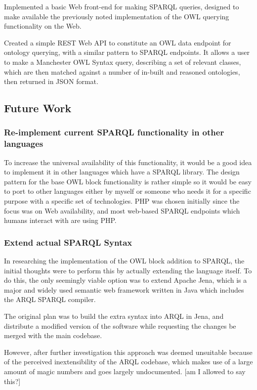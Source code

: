 \documentclass{article}
\begin{document}
Implemented a basic Web front-end for making SPARQL queries, designed to make
available the previously noted implementation of
the OWL querying functionality on the Web.

Created a simple REST Web API to constitute an OWL data endpoint for ontology
querying, with a similar pattern to SPARQL
endpoints. It allows a user to make a Manchester OWL Syntax query, describing a
set of relevant classes, which are then
matched against a number of in-built and reasoned ontologies, then returned in
JSON format.

\subsection{Future Work}

\subsubsection{Re-implement current SPARQL functionality in other languages}

To increase the universal availability of this functionality, it would be a good
idea to implement it in other languages which
have a SPARQL library. The design pattern for the base OWL block functionality
is rather simple so it would be easy to port
to other languages either by myself or someone who needs it for a specific
purpose with a specific set of technologies. PHP
was chosen initially since the focus was on Web availability, and most web-based
SPARQL endpoints which humans interact with
are using PHP.

\subsubsection{Extend actual SPARQL Syntax}

In researching the implementation of the OWL block addition to SPARQL, the
initial thoughts were to perform this by actually extending the language itself.
To do this, the only seemingly viable option was to extend Apache Jena, which is
a major and widely used semantic web framework written in Java which includes the 
ARQL SPARQL compiler. 

The original plan was to build the extra syntax into ARQL in Jena, and
distribute a modified version of the software while requesting the changes be
merged with the main codebase.

However, after further investigation this approach was deemed unsuitable because
of the perceived inextensibility of the ARQL codebase, which makes use of a
large amount of magic numbers and goes largely undocumented. [am I allowed to
say this?]
\end{document}
